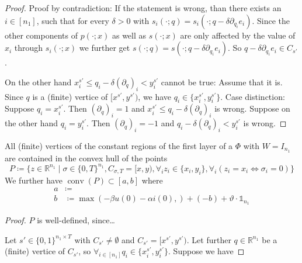 \begin{proof}
  Proof by contradiction: If the statement is wrong, than there exists an \(i∈[n_1]\), such that for every \(δ>0\) with \(s_i(·;q)=s_i(·;q-δ∂_q_ie_i)\).
  Since the other components of \(p(·;x)\) as well as \(s(·;x)\) are only affected by the value of \(x_i\) through \(s_i(·;x)\) we further get \(s(·;q)=s(·;q-δ∂_q_ie_i)\). So \(q-δ∂_q_ie_i∈C_{s'}\).

  On the other hand \(x^{s'}_i≤q_i-δ(∂_q)_i<y^{s'}_i\) cannot be true: Assume that it is. Since \(q\) is a (finite) vertice of \([x^{s'},y^{s'})\), we have \(q_i∈\{x^{s'}_i,y^{s'}_i\}\). Case distinction: Suppose \(q_i=x^{s'}_i\). Then \((∂_q)_i=1\) and \(x^{s'}_i≤q_i-δ(∂_q)_i\) is wrong. Suppose on the other hand \(q_i=y^{s'}_i\). Then \((∂_q)_i=-1\) and \(q_i-δ(∂_q)_i<y^{s'}_i\) is wrong.
\end{proof}

\begin{lemma}
  All (finite) vertices of the constant regions of the first layer of a \rdtlifsnn \(Φ\) with \(W=I_{n_1}\) are contained in the convex hull of the points
  \[ P≔\{z∈ℝ^{n_1}\mid σ∈\{0,T\}^{n_1},C_{σ,T}=[x,y),∀_iz_i∈\{x_i,y_i\},∀_i(z_i=x_i⇔σ_i=0)\} \]
  We further have \(\operatorname{conv}(P)⊂[a,b]\) where
  \begin{align*}
   a &≔ \\
   b &≔\max(-βu(0)-αi(0),)+(-b)+ϑ·𝟙_{n_1}
  \end{align*}
\end{lemma}

\begin{proof}
  \(P\) is well-defined, since…

  Let \(s'∈\{0,1\}^{n_1×T}\) with \(C_{s'}≠∅\) and \(C_{s'}=[x^{s'},y^{s'})\). Let further \(q∈ℝ^{n_1}\) be a (finite) vertice of \(C_{s'}\), so \(∀_{i∈[n_1]}q_i∈\{x^{s'}_i,y^{s'}_i\}\). Suppose we have
\end{proof}




